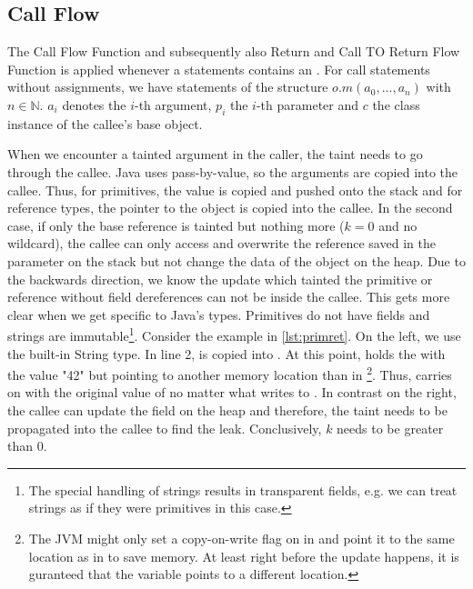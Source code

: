 \documentclass[../draft.tex]{subfiles}
\begin{document}
    \subsection{Call Flow}
    The Call Flow Function and subsequently also Return and Call TO Return Flow Function is applied whenever a statements contains an .
    For call statements without assignments, we have statements of the structure $o.m(a_0, ..., a_n)$ with $n \in \mathbb{N}$. $a_i$ denotes the $i$-th argument, $p_i$ the $i$-th parameter and $c$ the class instance of the callee's base object.

    When we encounter a tainted argument in the caller, the taint needs to go through the callee. Java uses pass-by-value, so the arguments are copied into the callee. Thus, for primitives, the value is copied and pushed onto the stack and for reference types, the pointer to the object is copied into the callee. In the second case, if only the base reference is tainted but nothing more ($k=0$ and no wildcard), the callee can only access and overwrite the reference saved in the parameter on the stack but not change the data of the object on the heap. 
    Due to the backwards direction, we know the update which tainted the primitive or reference without field dereferences can not be inside the callee. This gets more clear when we get specific to Java's types. Primitives do not have fields and strings are immutable\footnote{The special handling of strings results in transparent fields, e.g. we can treat strings as if they were primitives in this case.}. Consider the example in \autoref{lst:primret}. On the left, we use the built-in String type. In line 2,  is copied into . At this point,  holds the  with the value "42" but pointing to another memory location than  in \footnote{The JVM might only set a copy-on-write flag on  in  and point it to the same location as  in  to save memory. At least right before the update happens, it is guranteed that the variable points to a different location.}. Thus,  carries on with the original value of  no matter what  writes to . In contrast on the right, the callee can update the field on the heap and therefore, the taint needs to be propagated into the callee to find the leak. Conclusively, $k$ needs to be greater than $0$.
\end{document}
